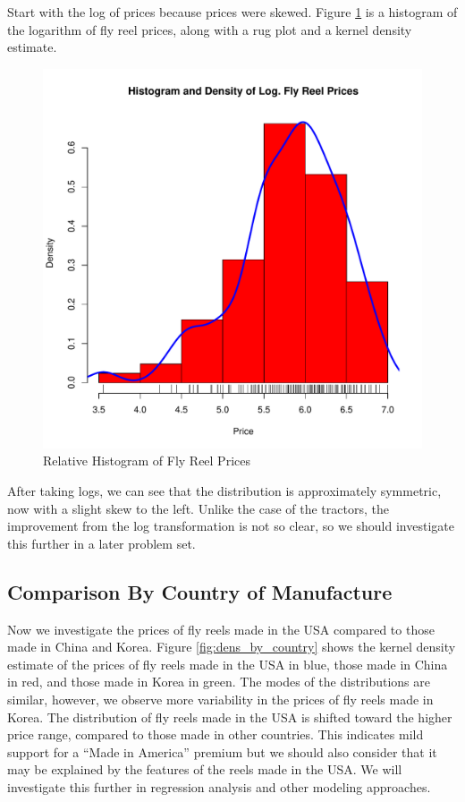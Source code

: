 Start with the log of prices because prices were skewed.
Figure \ref{fig:hist_dens_log_price} is
a histogram of the logarithm of fly reel prices, 
along with a rug plot and a kernel density estimate. 
%
\begin{figure}[h!]
  \centering
  \includegraphics[scale = 0.5, keepaspectratio=true]{../Figures/hist_dens_log_price}
  \caption{Relative Histogram of Fly Reel Prices} \label{fig:hist_dens_log_price}
\end{figure}
% 
After taking logs, we can see that the distribution is
approximately symmetric, now with a slight skew to the left. 
Unlike the case of the tractors, 
the improvement from the log transformation is not so clear, 
so we should investigate this further in a later problem set. 


\clearpage
\pagebreak
\subsection{Comparison By Country of Manufacture}

Now we investigate the prices of fly reels made in the USA
compared to those made in China and Korea.
Figure \ref{fig:dens_by_country} shows the 
kernel density estimate of the prices of 
fly reels made in the USA in blue,
those made in China in red, 
and those made in Korea in green.
% 
The modes of the distributions are similar, 
however, we observe more variability in the prices of fly reels
made in Korea. 
The distribution of fly reels made in the USA is shifted 
toward the higher price range, compared to those made in other countries.
This indicates mild support for a ``Made in America'' premium
but we should also consider that it may be explained by 
the features of the reels made in the USA. 
We will investigate this further in regression analysis 
and other modeling approaches. 



